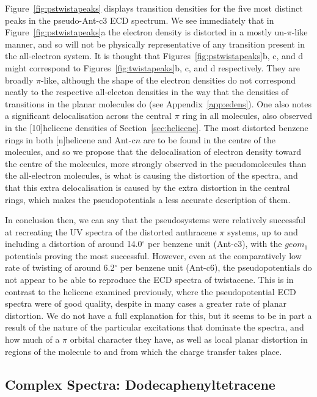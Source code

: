 \documentclass[aip,reprint,nofootinbib]{revtex4-1}
\begin{document}
Figure~\ref{fig:pstwistapeaks} displays transition densities for the five most distinct peaks in the pseudo-Ant-c3 ECD spectrum. We see immediately that in Figure~\ref{fig:pstwistapeaks}a the electron density is distorted in a mostly un-$\pi$-like manner, and so will not be physically representative of any transition present in the all-electron system. It is thought that Figures~\ref{fig:pstwistapeaks}b, c, and d might correspond to Figures~\ref{fig:twistapeaks}b, c, and d respectively. They are broadly $\pi$-like, although the shape of the electron densities do not correspond neatly to the respective all-electon densities in the way that the densities of transitions in the planar molecules do (see Appendix~\ref{app:edens}). One also notes a significant delocalisation across the central $\pi$ ring in all molecules, also observed in the [10]helicene densities of Section~\ref{sec:helicene}. The most distorted benzene rings in both [n]helicene and Ant-c$n$ are to be found in the centre of the molecules, and so we propose that the delocalisation of electron density toward the centre of the molecules, more strongly observed in the pseudomolecules than the all-electron molecules, is what is causing the distortion of the spectra, and that this extra delocalisation is caused by the extra distortion in the central rings, which makes the pseudopotentials a less accurate description of them.

In conclusion then, we can say that the pseudosystems were relatively successful at recreating the UV spectra of the distorted anthracene $\pi$ systems, up to and including a distortion of around 14.0$^{\circ}$ per benzene unit (Ant-c3), with the $geom_1$ potentials proving the most successful. However, even at the comparatively low rate of twisting of around 6.2$^{\circ}$ per benzene unit (Ant-c6), the pseudopotentials do not appear to be able to reproduce the ECD spectra of twistacene. This is in contrast to the helicene examined previously, where the pseudopotential ECD spectra were of good quality, despite in many cases a greater rate of planar distortion. We do not have a full explanation for this, but it seems to be in part a result of the nature of the particular excitations that dominate the spectra, and how much of a $\pi$ orbital character they have, as well as local planar distortion in regions of the molecule to and from which the charge transfer takes place.

\subsection{Complex Spectra: Dodecaphenyltetracene}
\label{sec:dodecaphenyltetracene}
\end{document}
